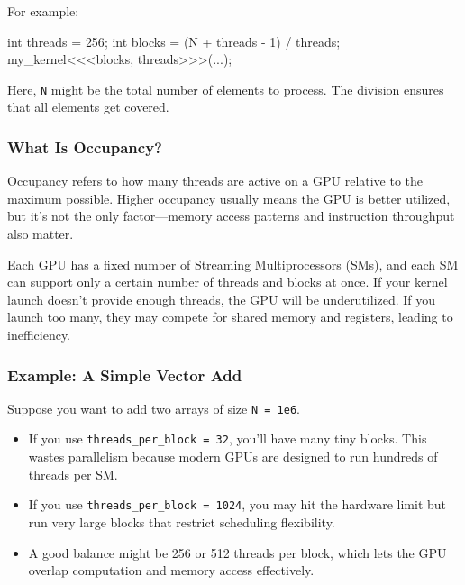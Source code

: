 \documentclass[
  letterpaper,
  DIV=11,
  numbers=noendperiod]{scrreprt}
\newenvironment{Shaded}{\begin{snugshade}}{\end{snugshade}}
\newcommand{\DataTypeTok}[1]{\textcolor[rgb]{0.68,0.00,0.00}{#1}}
\newcommand{\DecValTok}[1]{\textcolor[rgb]{0.68,0.00,0.00}{#1}}
\newcommand{\NormalTok}[1]{\textcolor[rgb]{0.00,0.23,0.31}{#1}}
\newcommand{\OperatorTok}[1]{\textcolor[rgb]{0.37,0.37,0.37}{#1}}
\providecommand{\tightlist}{%
  \setlength{\itemsep}{0pt}\setlength{\parskip}{0pt}}
\begin{document}
For example:

\begin{Shaded}
\begin{Highlighting}[]
\DataTypeTok{int}\NormalTok{ threads }\OperatorTok{=} \DecValTok{256}\OperatorTok{;}
\DataTypeTok{int}\NormalTok{ blocks }\OperatorTok{=} \OperatorTok{(}\NormalTok{N }\OperatorTok{+}\NormalTok{ threads }\OperatorTok{{-}} \DecValTok{1}\OperatorTok{)} \OperatorTok{/}\NormalTok{ threads}\OperatorTok{;}
\NormalTok{my\_kernel}\OperatorTok{\textless{}\textless{}\textless{}}\NormalTok{blocks}\OperatorTok{,}\NormalTok{ threads}\OperatorTok{\textgreater{}\textgreater{}\textgreater{}(...);}
\end{Highlighting}
\end{Shaded}

Here, \texttt{N} might be the total number of elements to process. The
division ensures that all elements get covered.

\subsubsection{What Is Occupancy?}\label{what-is-occupancy}

Occupancy refers to how many threads are active on a GPU relative to the
maximum possible. Higher occupancy usually means the GPU is better
utilized, but it's not the only factor---memory access patterns and
instruction throughput also matter.

Each GPU has a fixed number of Streaming Multiprocessors (SMs), and each
SM can support only a certain number of threads and blocks at once. If
your kernel launch doesn't provide enough threads, the GPU will be
underutilized. If you launch too many, they may compete for shared
memory and registers, leading to inefficiency.

\subsubsection{Example: A Simple Vector
Add}\label{example-a-simple-vector-add}

Suppose you want to add two arrays of size \texttt{N\ =\ 1e6}.

\begin{itemize}
\tightlist
\item
  If you use \texttt{threads\_per\_block\ =\ 32}, you'll have many tiny
  blocks. This wastes parallelism because modern GPUs are designed to
  run hundreds of threads per SM.
\item
  If you use \texttt{threads\_per\_block\ =\ 1024}, you may hit the
  hardware limit but run very large blocks that restrict scheduling
  flexibility.
\item
  A good balance might be 256 or 512 threads per block, which lets the
  GPU overlap computation and memory access effectively.
\end{itemize}
\end{document}

